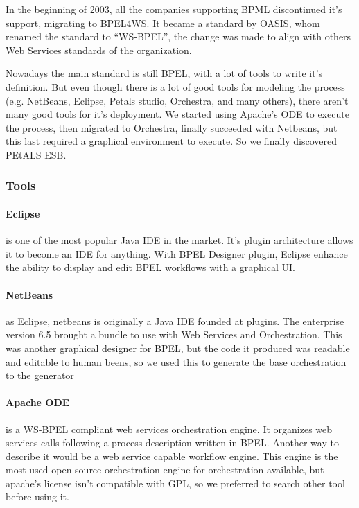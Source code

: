 In the beginning of 2003, all the companies supporting BPML discontinued it's support, migrating to BPEL4WS. It became a standard by OASIS, whom renamed the standard to ``WS-BPEL'', the change was made to align with others Web Services standards of the organization. \citep{OASIS}

Nowadays the main standard is still BPEL, with a lot of tools to write it's definition. But even though there is a lot of good tools for modeling the process (e.g. NetBeans, Eclipse, Petals studio, Orchestra, and many others), there aren't many good tools for it's deployment. We started using Apache's ODE to execute the process, then migrated to Orchestra, finally succeeded with Netbeans, but this last required a graphical environment to execute. So we finally discovered PEtALS ESB. 

\subsubsection{Tools}

\paragraph{Eclipse}
is one of the most popular Java IDE in the market. It's plugin architecture allows it to become an IDE for anything. With BPEL Designer plugin, Eclipse enhance the ability to display and edit BPEL workflows with a graphical UI.

\paragraph{NetBeans}
as Eclipse, netbeans is originally a Java IDE founded at plugins. The enterprise version 6.5 brought a bundle to use with Web Services and Orchestration. This was another graphical designer for BPEL, but the code it produced was readable and editable to human beens, so we used this to generate the base orchestration to the generator

\paragraph{Apache ODE}
is a WS-BPEL compliant web services orchestration engine. It organizes web services calls following a process description written in BPEL. Another way to describe it would be a web service capable workflow engine. This engine is the most used open source orchestration engine for orchestration available, but apache's license isn't compatible with GPL, so we preferred to search other tool before using it.

